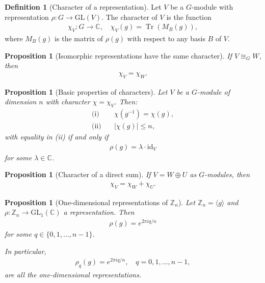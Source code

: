 \documentclass[titlepage]{article}
\theoremstyle{plain}
\newtheorem{proposition}[theorem]{Proposition}
\theoremstyle{definition}
\newtheorem{definition}{Definition}[section]
\theoremstyle{remark}
\theoremstyle{exercise-style}
\numberwithin{equation}{section}
\numberwithin{theorem}{section}
\numberwithin{remark}{section}
\begin{document}
\begin{definition}[Character of a representation]
Let $V$ be a $G$-module with representation $\rho: G \to \mathrm{GL}(V)$. The character of $V$ is the function
\begin{align}
\chi_V: G \to \mathbb{C}, \quad \chi_V(g) = \operatorname{Tr}(M_B(g)),
\end{align}
where $M_B(g)$ is the matrix of $\rho(g)$ with respect to any basis $B$ of $V$.
\end{definition}

\begin{proposition}[Isomorphic representations have the same character]
If $V \cong_G W$, then
\begin{align}
\chi_V = \chi_W.
\end{align}
\end{proposition}

\begin{proposition}[Basic properties of characters]
Let $V$ be a $G$-module of dimension $n$ with character $\chi = \chi_V$. Then:
\begin{align}
\text{(i)} \quad & \chi(g^{-1}) = \chi(g), \\
\text{(ii)} \quad & |\chi(g)| \le n,
\end{align}
with equality in (ii) if and only if
\begin{align}
\rho(g) = \lambda \cdot \mathrm{id}_V
\end{align}
for some $\lambda \in \mathbb{C}$.
\end{proposition}

\begin{proposition}[Character of a direct sum]
If $V = W \oplus U$ as $G$-modules, then
\begin{align}
\chi_V = \chi_W + \chi_U.
\end{align}
\end{proposition}

\begin{proposition}[One-dimensional representations of $\mathbb{Z}_n$]
Let $\mathbb{Z}_n = \langle g \rangle$ and $\rho: \mathbb{Z}_n \to \mathrm{GL}_1(\mathbb{C})$ a representation. Then
\begin{align}
\rho(g) = e^{2\pi i q / n}
\end{align}
for some $q \in \{0,1,\dots,n-1\}$.

In particular,
\begin{align}
\rho_q(g) = e^{2\pi i q / n}, \quad q = 0,1,\dots,n-1,
\end{align}
are all the one-dimensional representations.
\end{proposition}
\end{document}
